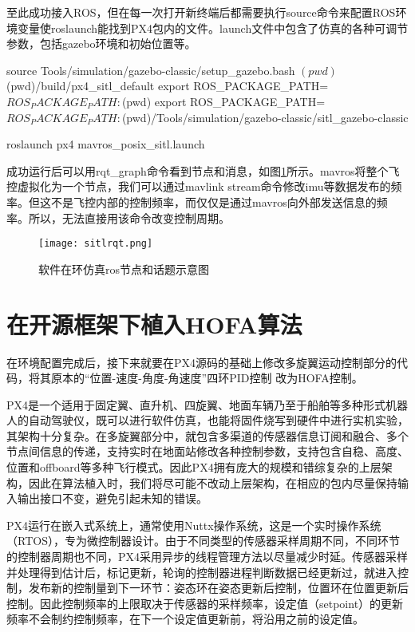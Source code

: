 至此成功接入ROS，但在每一次打开新终端后都需要执行source命令来配置ROS环境变量使roslaunch能找到PX4包内的文件。launch文件中包含了仿真的各种可调节参数，包括gazebo环境和初始位置等。
\begin{codeblock}[language=C]
  source Tools/simulation/gazebo-classic/setup_gazebo.bash $(pwd) $(pwd)/build/px4_sitl_default
  export ROS_PACKAGE_PATH=$ROS_PACKAGE_PATH:$(pwd)
  export ROS_PACKAGE_PATH=$ROS_PACKAGE_PATH:$(pwd)/Tools/simulation/gazebo-classic/sitl_gazebo-classic

  roslaunch px4 mavros_posix_sitl.launch
\end{codeblock}
成功运行后可以用rqt\_graph命令看到节点和消息，如图\ref{sitlrqt}所示。mavros将整个飞控虚拟化为一个节点，我们可以通过mavlink stream命令修改imu等数据发布的频率。但这不是飞控内部的控制频率，而仅仅是通过mavros向外部发送信息的频率。所以，无法直接用该命令改变控制周期。
\begin{figure}[!h]
  \centering
  \texttt{[image: sitlrqt.png]}
  \caption{软件在环仿真ros节点和话题示意图}
  \label{sitlrqt}
\end{figure}

 \section{在开源框架下植入HOFA算法}
在环境配置完成后，接下来就要在PX4源码的基础上修改多旋翼运动控制部分的代码，将其原本的“位置-速度-角度-角速度”四环PID控制 \cite{px4}改为HOFA控制。

PX4是一个适用于固定翼、直升机、四旋翼、地面车辆乃至于船舶等多种形式机器人的自动驾驶仪，既可以进行软件仿真，也能将固件烧写到硬件中进行实机实验，其架构十分复杂。在多旋翼部分中，就包含多渠道的传感器信息订阅和融合、多个节点间信息的传递，支持实时在地面站修改各种控制参数，支持包含自稳、高度、位置和offboard等多种飞行模式。因此PX4拥有庞大的规模和错综复杂的上层架构，因此在算法植入时，我们将尽可能不改动上层架构，在相应的包内尽量保持输入输出接口不变，避免引起未知的错误。

PX4运行在嵌入式系统上，通常使用Nuttx操作系统，这是一个实时操作系统（RTOS），专为微控制器设计。由于不同类型的传感器采样周期不同，不同环节的控制器周期也不同，PX4采用异步的线程管理方法以尽量减少时延。传感器采样并处理得到估计后，标记更新，轮询的控制器进程判断数据已经更新过，就进入控制，发布新的控制量到下一环节：姿态环在姿态更新后控制，位置环在位置更新后控制。因此控制频率的上限取决于传感器的采样频率，设定值（setpoint）的更新频率不会制约控制频率，在下一个设定值更新前，将沿用之前的设定值。

